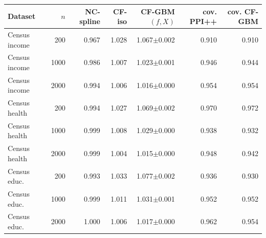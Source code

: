 \begin{tabular}{lrrrrrr}
\toprule
Dataset & $n$ & NC-spline & CF-iso & CF-GBM$(f,X)$ & cov. PPI++ & cov. CF-GBM \\
\midrule
Census income & 200 & 0.967 & 1.028 & 1.067$\pm$0.002 & 0.910 & 0.910 \\
Census income & 1000 & 0.986 & 1.007 & 1.023$\pm$0.001 & 0.946 & 0.944 \\
Census income & 2000 & 0.994 & 1.006 & 1.016$\pm$0.000 & 0.954 & 0.954 \\
Census health & 200 & 0.994 & 1.027 & 1.069$\pm$0.002 & 0.970 & 0.972 \\
Census health & 1000 & 0.999 & 1.008 & 1.029$\pm$0.000 & 0.938 & 0.932 \\
Census health & 2000 & 0.999 & 1.004 & 1.015$\pm$0.000 & 0.948 & 0.942 \\
Census educ. & 200 & 0.993 & 1.033 & 1.077$\pm$0.002 & 0.936 & 0.930 \\
Census educ. & 1000 & 0.999 & 1.011 & 1.031$\pm$0.001 & 0.952 & 0.952 \\
Census educ. & 2000 & 1.000 & 1.006 & 1.017$\pm$0.000 & 0.962 & 0.954 \\
\bottomrule
\end{tabular}